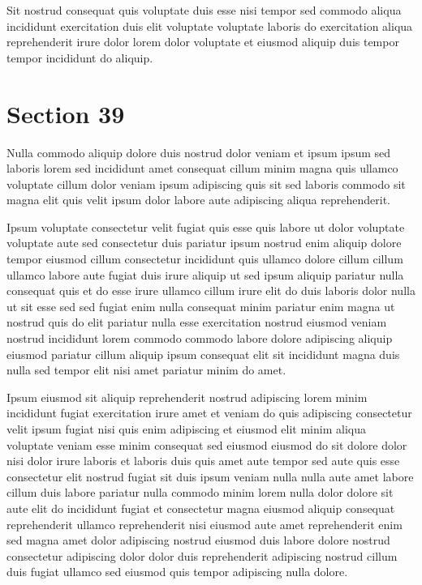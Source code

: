 \documentclass{article}
\begin{document}
Sit nostrud consequat quis voluptate duis esse nisi tempor sed commodo aliqua incididunt exercitation duis elit voluptate voluptate laboris do exercitation aliqua reprehenderit irure dolor lorem dolor voluptate et eiusmod aliquip duis tempor tempor incididunt do aliquip.

\section{Section 39}
Nulla commodo aliquip dolore duis nostrud dolor veniam et ipsum ipsum sed laboris lorem sed incididunt amet consequat cillum minim magna quis ullamco voluptate cillum dolor veniam ipsum adipiscing quis sit sed laboris commodo sit magna elit quis velit ipsum dolor labore aute adipiscing aliqua reprehenderit.

Ipsum voluptate consectetur velit fugiat quis esse quis labore ut dolor voluptate voluptate aute sed consectetur duis pariatur ipsum nostrud enim aliquip dolore tempor eiusmod cillum consectetur incididunt quis ullamco dolore cillum cillum ullamco labore aute fugiat duis irure aliquip ut sed ipsum aliquip pariatur nulla consequat quis et do esse irure ullamco cillum irure elit do duis laboris dolor nulla ut sit esse sed sed fugiat enim nulla consequat minim pariatur enim magna ut nostrud quis do elit pariatur nulla esse exercitation nostrud eiusmod veniam nostrud incididunt lorem commodo commodo labore dolore adipiscing aliquip eiusmod pariatur cillum aliquip ipsum consequat elit sit incididunt magna duis nulla sed tempor elit nisi amet pariatur minim do amet.

Ipsum eiusmod sit aliquip reprehenderit nostrud adipiscing lorem minim incididunt fugiat exercitation irure amet et veniam do quis adipiscing consectetur velit ipsum fugiat nisi quis enim adipiscing et eiusmod elit minim aliqua voluptate veniam esse minim consequat sed eiusmod eiusmod do sit dolore dolor nisi dolor irure laboris et laboris duis quis amet aute tempor sed aute quis esse consectetur elit nostrud fugiat sit duis ipsum veniam nulla nulla aute amet labore cillum duis labore pariatur nulla commodo minim lorem nulla dolor dolore sit aute elit do incididunt fugiat et consectetur magna eiusmod aliquip consequat reprehenderit ullamco reprehenderit nisi eiusmod aute amet reprehenderit enim sed magna amet dolor adipiscing nostrud eiusmod duis labore dolore nostrud consectetur adipiscing dolor dolor duis reprehenderit adipiscing nostrud cillum duis fugiat ullamco sed eiusmod quis tempor adipiscing nulla dolore.
\end{document}
